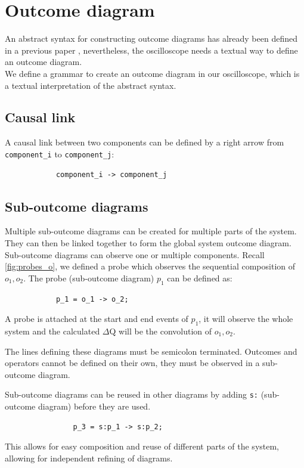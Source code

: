 \section{Outcome diagram} \label{out_syntax}
        An abstract syntax for constructing outcome diagrams has already been defined in a previous paper \cite{art}, nevertheless, the oscilloscope needs a textual way to define an outcome diagram. \\ 
        We define  a grammar to create an outcome diagram in our oscilloscope, which is a textual interpretation of the abstract syntax.
        
      
        \subsection{Causal link}
            A causal link between two components can be defined by a right arrow from \texttt{component\_i} to \texttt{component\_j}:
        \begin{verbatim}
            component_i -> component_j 
        \end{verbatim}
        
        \subsection{Sub-outcome diagrams}
            Multiple sub-outcome diagrams can be created for multiple parts of the system. They can then be linked together to form the global system outcome diagram. Sub-outcome diagrams can observe one or multiple components.
        Recall \cref{fig:probes_o}, we defined a probe which observes the sequential composition of $o_1, o_2$. The probe (sub-outcome diagram) $p_1$ can be defined as:
        \begin{verbatim}
            p_1 = o_1 -> o_2;
        \end{verbatim}

        A probe is attached at the start and end events of $p_1$, it will observe the whole system and the calculated $\Delta$Q will be the convolution of $o_1, o_2$.

        The lines defining these diagrams must be semicolon terminated. Outcomes and operators cannot be defined on their own, they must be observed in a sub-outcome diagram.
        
        Sub-outcome diagrams can be reused in other diagrams by adding \texttt{s:} (sub-outcome diagram) before they are used.

            \begin{verbatim}
                p_3 = s:p_1 -> s:p_2;
            \end{verbatim}
            This allows for easy composition and reuse of different parts of the system, allowing for independent refining of diagrams.

